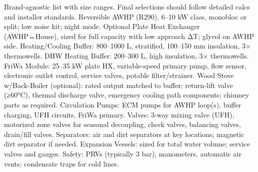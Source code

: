 \markdownRendererDocumentBegin
\markdownRendererSectionBegin
{}\markdownRendererInterblockSeparator
{}Brand‑agnostic list with size ranges. Final selections should follow detailed calcs and installer standards.\markdownRendererInterblockSeparator
{}\markdownRendererSectionBegin
{}\markdownRendererInterblockSeparator
{}\markdownRendererUlBeginTight
\markdownRendererUlItem Reversible AWHP (R290), 6–10 kW class, monobloc or split; low noise kit; night mode.\markdownRendererUlItemEnd 
\markdownRendererUlItem Optional Plate Heat Exchanger (AWHP↔House), sized for full capacity with low approach ΔT; glycol on AWHP side.\markdownRendererUlItemEnd 
\markdownRendererUlItem Heating/Cooling Buffer: 800–1000 L, stratified, 100–150 mm insulation, 3× thermowells.\markdownRendererUlItemEnd 
\markdownRendererUlItem DHW Heating Buffer: 200–300 L, high insulation, 3× thermowells.\markdownRendererUlItemEnd 
\markdownRendererUlItem FriWa Module: 25–35 kW plate HX, variable‑speed primary pump, flow sensor, electronic outlet control, service valves, potable filter/strainer.\markdownRendererUlItemEnd 
\markdownRendererUlItem Wood Stove w/Back‑Boiler (optional): rated output matched to buffer; return‑lift valve (≥60°C), thermal discharge valve, emergency cooling path components; chimney parts as required.\markdownRendererUlItemEnd 
\markdownRendererUlEndTight \markdownRendererInterblockSeparator
{}
\markdownRendererSectionEnd \markdownRendererSectionBegin
{}\markdownRendererInterblockSeparator
{}\markdownRendererUlBeginTight
\markdownRendererUlItem Circulation Pumps: ECM pumps for AWHP loop(s), buffer charging, UFH circuits, FriWa primary.\markdownRendererUlItemEnd 
\markdownRendererUlItem Valves: 3‑way mixing valve (UFH), motorized zone valves for seasonal decoupling, check valves, balancing valves, drain/fill valves.\markdownRendererUlItemEnd 
\markdownRendererUlItem Separators: air and dirt separators at key locations; magnetic dirt separator if needed.\markdownRendererUlItemEnd 
\markdownRendererUlItem Expansion Vessels: sized for total water volume; service valves and gauges.\markdownRendererUlItemEnd 
\markdownRendererUlItem Safety: PRVs (typically 3 bar), manometers, automatic air vents; condensate traps for cold lines.\markdownRendererUlItemEnd 
\markdownRendererUlEndTight \markdownRendererInterblockSeparator
{}
\markdownRendererSectionEnd \markdownRendererSectionBegin
{}\markdownRendererInterblockSeparator
